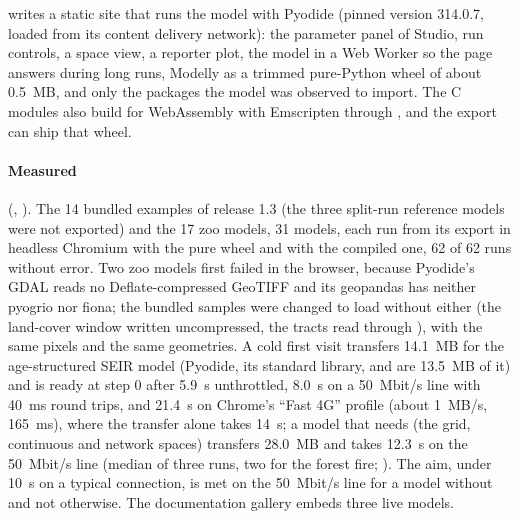  writes a static site that runs the model with Pyodide
\citep{pyodide} (pinned version 314.0.7, loaded from its content delivery network): the parameter panel of Studio,
run controls, a space view, a reporter plot, the model in a Web Worker so the page answers
during long runs, Modelly as a trimmed pure-Python wheel of about 0.5~MB, and only the
packages the model was observed to import. The C modules also build for WebAssembly with
Emscripten through , and the export can ship that wheel.

\paragraph{Measured} (, ). The 14
bundled examples of release 1.3 (the three split-run reference models were not exported) and
the 17 zoo models, 31 models, each run from its export in headless Chromium with the pure
wheel and with the compiled one, 62 of 62 runs without error. Two zoo models first failed in
the browser, because Pyodide's GDAL reads no Deflate-compressed GeoTIFF and its geopandas has
neither pyogrio nor fiona; the bundled samples were changed to load without either (the
land-cover window written uncompressed, the tracts read through
), with the same pixels and the same geometries. A cold
first visit transfers 14.1~MB for the age-structured SEIR model
(Pyodide, its standard library,  and  are 13.5~MB of it) and is
ready at step 0 after 5.9~s unthrottled, 8.0~s on a 50~Mbit/s line with 40~ms round trips, and
21.4~s on Chrome's ``Fast 4G'' profile (about 1~MB/s, 165~ms), where the transfer alone takes
14~s; a model that needs  (the grid, continuous and network spaces) transfers
28.0~MB and takes 12.3~s on the 50~Mbit/s line (median of three runs, two for the forest
fire; ). The aim, under 10~s on a typical
connection, is met on the 50~Mbit/s line for a model without  and not otherwise.
The documentation gallery embeds three live models.

